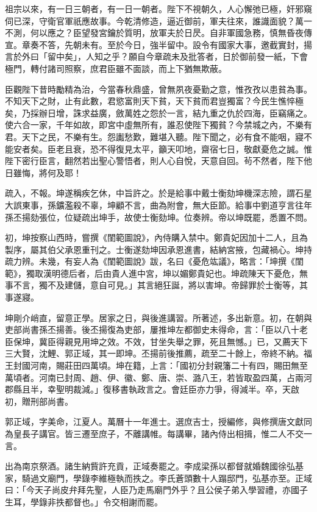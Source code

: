 \begin{pinyinscope}
祖宗以來，有一日三朝者，有一日一朝者。陛下不視朝久，人心懈弛已極，奸邪窺伺已深，守衛官軍祇應故事。今乾清修造，逼近御前，軍夫往來，誰識面貌？萬一不測，何以應之？臣望發宮鑰於質明，放軍夫於日昃。自非軍國急務，慎無昏夜傳宣。章奏不答，先朝未有。至於今日，強半留中。設令有國家大事，邀截實封，揚言於外曰「留中矣」，人知之乎？願自今章疏未及批答者，日於御前發一紙，下會極門，轉付諸司照察，庶君臣雖不面談，而上下猶無欺蔽。

臣觀陛下昔時勵精為治，今當春秋鼎盛，曾無夙夜憂勤之意，惟孜孜以患貧為事。不知天下之財，止有此數，君慾富則天下貧，天下貧而君豈獨富？今民生憔悴極矣，乃採辦日增，誅求益廣，斂萬姓之怨於一言，結九重之仇於四海，臣竊痛之。使六合一家，千年如故，即宮中虛無所有，誰忍使陛下獨貧？今禁城之內，不樂有君。天下之民，不樂有生。怨讟愁歎，難堪入聽。陛下聞之，必有食不能咽，寢不能安者矣。臣老且衰，恐不得復見太平，籲天叩地，齋宿七日，敬獻憂危之誠。惟陛下密行臣言，翻然若出聖心警悟者，則人心自悅，天意自回。茍不然者，陛下他日雖悔，將何及耶！

疏入，不報。坤遂稱疾乞休，中旨許之。於是給事中戴士衡劾坤機深志險，謂石星大誤東事，孫鑛濫殺不辜，坤顧不言，曲為附會，無大臣節。給事中劉道亨言往年孫丕揚劾張位，位疑疏出坤手，故使士衡劾坤。位奏辨。帝以坤既罷，悉置不問。

初，坤按察山西時，嘗撰《閨範圖說》，內侍購入禁中。鄭貴妃因加十二人，且為製序，屬其伯父承恩重刊之。士衡遂劾坤因承恩進書，結納宮掖，包藏禍心。坤持疏力辨。未幾，有妄人為《閨範圖說》跋，名曰《憂危竑議》，略言：「坤撰《閨範》，獨取漢明德后者，后由貴人進中宮，坤以媚鄭貴妃也。坤疏陳天下憂危，無事不言，獨不及建儲，意自可見。」其言絕狂誕，將以害坤。帝歸罪於士衡等，其事遂寢。

坤剛介峭直，留意正學。居家之日，與後進講習。所著述，多出新意。初，在朝與吏部尚書孫丕揚善。後丕揚復為吏部，屢推坤左都御史未得命，言：「臣以八十老臣保坤，冀臣得親見用坤之效。不效，甘坐失舉之罪，死且無憾。」已，又薦天下三大賢，沈鯉、郭正域，其一即坤。丕揚前後推薦，疏至二十餘上，帝終不納。福王封國河南，賜莊田四萬頃。坤在籍，上言：「國初分封親籓二十有四，賜田無至萬頃者。河南已封周、趙、伊、徽、鄭、唐、崇、潞八王，若皆取盈四萬，占兩河郡縣且半，幸聖明裁減。」復移書執政言之。會廷臣亦力爭，得減半。卒，天啟初，贈刑部尚書。

郭正域，字美命，江夏人。萬曆十一年進士。選庶吉士，授編修，與修撰唐文獻同為皇長子講官。皆三遷至庶子，不離講帷。每講畢，諸內侍出相揖，惟二人不交一言。

出為南京祭酒。諸生納貲許充貢，正域奏罷之。李成梁孫以都督就婚魏國徐弘基家，騎過文廟門，學錄李維極執而抶之。李氏蒼頭數十人蹋邸門，弘基亦至。正域曰：「今天子尚皮弁拜先聖，人臣乃走馬廟門外乎？且公侯子弟入學習禮，亦國子生耳，學錄非抶都督也。」令交相謝而罷。


\end{pinyinscope}
